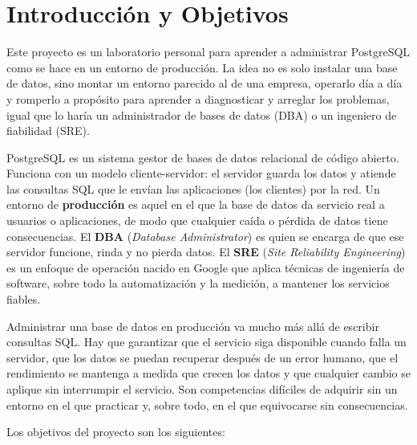 \documentclass[11pt, a4paper, titlepage]{article}
\begin{document}

\vspace{0.5cm}
\tableofcontents
\newpage
{}

\section{Introducción y Objetivos}

Este proyecto es un laboratorio personal para aprender a administrar PostgreSQL como se hace en un entorno de producción. La idea no es solo instalar una base de datos, sino montar un entorno parecido al de una empresa, operarlo día a día y romperlo a propósito para aprender a diagnosticar y arreglar los problemas, igual que lo haría un administrador de bases de datos (DBA) o un ingeniero de fiabilidad (SRE).

PostgreSQL es un sistema gestor de bases de datos relacional de código abierto. Funciona con un modelo cliente-servidor: el servidor guarda los datos y atiende las consultas SQL que le envían las aplicaciones (los clientes) por la red. Un entorno de \textbf{producción} es aquel en el que la base de datos da servicio real a usuarios o aplicaciones, de modo que cualquier caída o pérdida de datos tiene consecuencias. El \textbf{DBA} (\textit{Database Administrator}) es quien se encarga de que ese servidor funcione, rinda y no pierda datos. El \textbf{SRE} (\textit{Site Reliability Engineering}) es un enfoque de operación nacido en Google que aplica técnicas de ingeniería de software, sobre todo la automatización y la medición, a mantener los servicios fiables.

Administrar una base de datos en producción va mucho más allá de escribir consultas SQL. Hay que garantizar que el servicio siga disponible cuando falla un servidor, que los datos se puedan recuperar después de un error humano, que el rendimiento se mantenga a medida que crecen los datos y que cualquier cambio se aplique sin interrumpir el servicio. Son competencias difíciles de adquirir sin un entorno en el que practicar y, sobre todo, en el que equivocarse sin consecuencias.

Los objetivos del proyecto son los siguientes:
\end{document}
